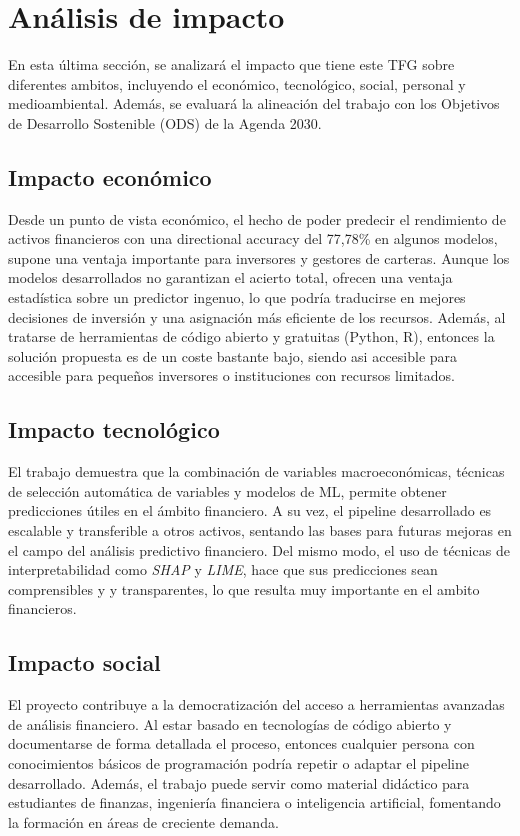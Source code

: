 \section{Análisis de impacto}
En esta última sección, se analizará el impacto que tiene este TFG sobre diferentes ambitos, incluyendo el económico, tecnológico, social, personal y medioambiental. Además, se evaluará la alineación del trabajo con los Objetivos de Desarrollo Sostenible (ODS) \cite{ods} de la Agenda 2030.

\subsection{Impacto económico}
Desde un punto de vista económico, el hecho de poder predecir el rendimiento de activos financieros con una directional accuracy del 77,78\% en algunos modelos, supone una ventaja importante para inversores y gestores de carteras. Aunque los modelos desarrollados no garantizan el acierto total, ofrecen una ventaja estadística sobre un predictor ingenuo, lo que podría traducirse en mejores decisiones de inversión y una asignación más eficiente de los recursos. Además, al tratarse de herramientas de código abierto y gratuitas (Python, R), entonces la solución propuesta es de un coste bastante bajo, siendo asi accesible para accesible para pequeños inversores o instituciones con recursos limitados.

\subsection{Impacto tecnológico}
El trabajo demuestra que la combinación de variables macroeconómicas, técnicas de selección automática de variables y modelos de ML, permite obtener predicciones útiles en el ámbito financiero. A su vez, el pipeline desarrollado es escalable y transferible a otros activos, sentando las bases para futuras mejoras en el campo del análisis predictivo financiero. Del mismo modo, el uso de técnicas de interpretabilidad como \emph{SHAP} y \emph{LIME}, hace que sus predicciones sean comprensibles y y transparentes, lo que resulta muy importante en el ambito financieros.

\subsection{Impacto social}
El proyecto contribuye a la democratización del acceso a herramientas avanzadas de análisis financiero. Al estar basado en tecnologías de código abierto y documentarse de forma detallada el proceso, entonces cualquier persona con conocimientos básicos de programación podría repetir o adaptar el pipeline desarrollado. Además, el trabajo puede servir como material didáctico para estudiantes de finanzas, ingeniería financiera o inteligencia artificial, fomentando la formación en áreas de creciente demanda.

